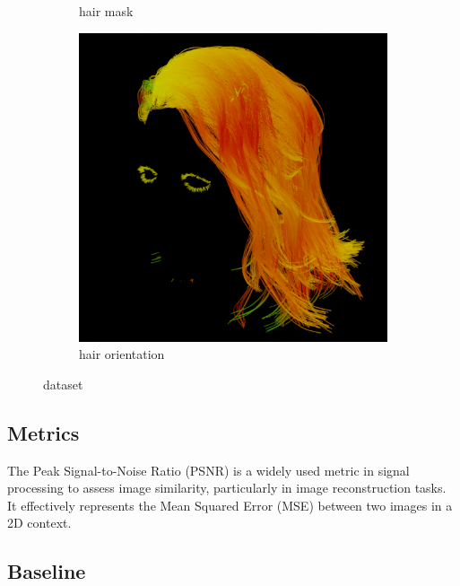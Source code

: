 \documentclass[12pt]{article}
\begin{document}
\begin{figure}[h]
\begin{subfigure}{0.24\textwidth}
		\caption{hair mask}
	\end{subfigure}
	\hfill
	\begin{subfigure}{0.24\textwidth}
		\centering
		\includegraphics[width=\textwidth]{./images/0009_hairdir.png}
		\caption{hair orientation}
	\end{subfigure}

	\caption{dataset}
	\label{fig:dataset}
\end{figure}

\subsection{Metrics}

The Peak Signal-to-Noise Ratio (PSNR) is a widely used metric in signal processing to assess image similarity, particularly in image reconstruction tasks. It effectively represents the Mean Squared Error (MSE) between two images in a 2D context.

\subsection{Baseline}
\end{document}
